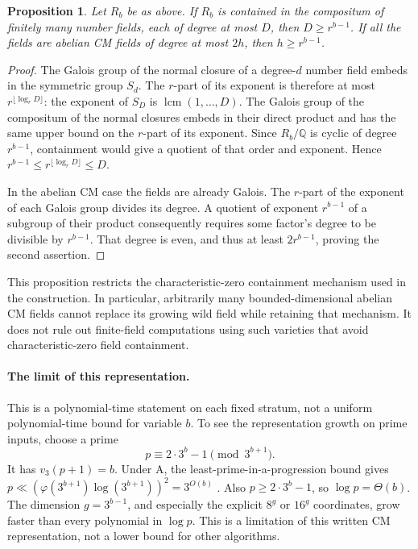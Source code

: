 \documentclass[11pt]{article}
\newtheorem{proposition}[theorem]{Proposition}
\theoremstyle{definition}
\theoremstyle{remark}
\begin{document}
\begin{proposition}\label{prop:bounded-degree-wild-containment}
Let \(R_b\) be as above. If \(R_b\) is contained in the
compositum of finitely many number fields, each of degree at
most \(D\), then \(D\geq r^{b-1}\).
If all the fields are abelian CM fields of degree at most
\(2h\), then \(h\geq r^{b-1}\).
\end{proposition}
\begin{proof}
The Galois group of the normal closure of a degree-\(d\)
number field embeds in the symmetric group \(S_d\).
The \(r\)-part of its exponent is therefore at most
\(r^{\lfloor\log_rD\rfloor}\): the exponent of \(S_D\)
is \(\operatorname{lcm}(1,\ldots,D)\).
The Galois group of the compositum of the normal closures
embeds in their direct product and has the same upper bound
on the \(r\)-part of its exponent. Since \(R_b/\mathbb Q\)
is cyclic of degree \(r^{b-1}\), containment would give a
quotient of that order and exponent. Hence
\(r^{b-1}\leq r^{\lfloor\log_rD\rfloor}\leq D\).

In the abelian CM case the fields are already Galois. The
\(r\)-part of the exponent of each Galois group divides its
degree. A quotient of exponent \(r^{b-1}\) of a subgroup of
their product consequently requires some factor's degree to
be divisible by \(r^{b-1}\). That degree is even, and thus
at least \(2r^{b-1}\), proving the second assertion.
\end{proof}

This proposition restricts the characteristic-zero containment
mechanism used in the construction. In particular, arbitrarily
many bounded-dimensional abelian CM fields cannot replace its
growing wild field while retaining that mechanism. It does not
rule out finite-field computations using such varieties that
avoid characteristic-zero field containment.



\paragraph{The limit of this representation.}
This is a polynomial-time statement on each fixed stratum,
not a uniform polynomial-time bound for variable \(b\).
To see the representation growth on prime inputs,
choose a prime
\[
 p\equiv 2\cdot3^b-1\pmod{3^{b+1}}.
\]
It has \(v_3(p+1)=b\). Under \(\mathrm A\), the
least-prime-in-a-progression bound gives
\(p\ll (\varphi(3^{b+1})\log(3^{b+1}))^2=3^{O(b)}\)
\citep[Corollary~1.2]{LLS2015}. Also \(p\ge2\cdot3^b-1\),
so \(\log p=\Theta(b)\). The dimension
\(g=3^{b-1}\), and especially the explicit \(8^g\) or
\(16^g\) coordinates, grow faster than every polynomial
in \(\log p\). This is a limitation of this written CM
representation, not a lower bound for other algorithms.
\end{document}
